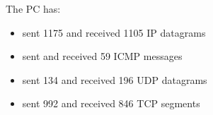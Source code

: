 The PC has:
\begin{itemize}
	\item sent 1175 and received 1105 IP datagrams
	\item sent and received 59 ICMP messages
	\item sent 134 and received 196 UDP datagrams
	\item sent 992 and received 846 TCP segments
\end{itemize}
